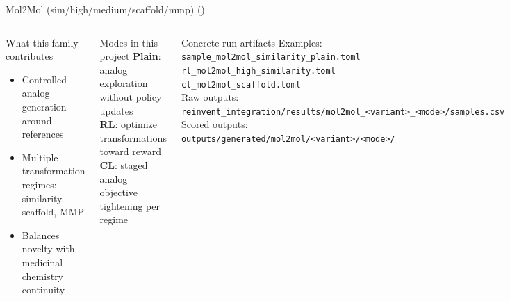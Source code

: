 \documentclass[aspectratio=169,10pt]{beamer}
\begin{document}
\begin{frame}{Mol2Mol (sim/high/medium/scaffold/mmp) (\checkmark \checkmark \checkmark)}
  \small
  \begin{columns}[T]
      \begin{block}{What this family contributes}
        \begin{itemize}
          \item Controlled analog generation around references
          \item Multiple transformation regimes: similarity, scaffold, MMP
          \item Balances novelty with medicinal chemistry continuity
        \end{itemize}
      \end{block}
      \begin{block}{Modes in this project}
        \textbf{Plain}: analog exploration without policy updates\\
        \textbf{RL}: optimize transformations toward reward\\
        \textbf{CL}: staged analog objective tightening per regime
      \end{block}
      \begin{block}{Concrete run artifacts}
        Examples:\\
        {\scriptsize\texttt{sample\_mol2mol\_similarity\_plain.toml}}\\
        {\scriptsize\texttt{rl\_mol2mol\_high\_similarity.toml}}\\
        {\scriptsize\texttt{cl\_mol2mol\_scaffold.toml}}\\[2pt]
        Raw outputs:\\
        {\scriptsize\texttt{reinvent\_integration/results/mol2mol\_<variant>\_<mode>/samples.csv}}\\
        Scored outputs:\\
        {\scriptsize\texttt{outputs/generated/mol2mol/<variant>/<mode>/}}
      \end{block}
  \end{columns}
\end{frame}
\end{document}
